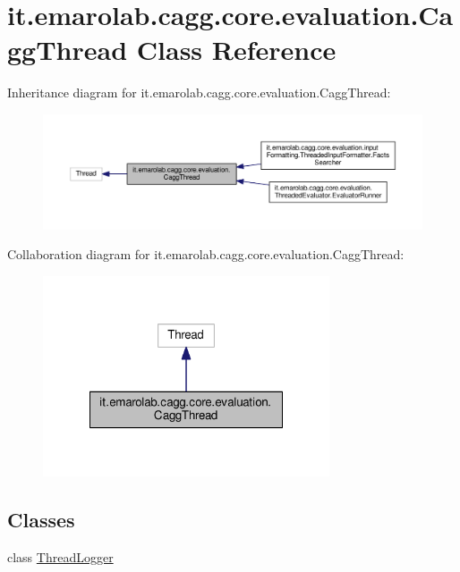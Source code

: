 \hypertarget{classit_1_1emarolab_1_1cagg_1_1core_1_1evaluation_1_1CaggThread}{\section{it.\-emarolab.\-cagg.\-core.\-evaluation.\-Cagg\-Thread Class Reference}
\label{classit_1_1emarolab_1_1cagg_1_1core_1_1evaluation_1_1CaggThread}
}


Inheritance diagram for it.\-emarolab.\-cagg.\-core.\-evaluation.\-Cagg\-Thread\-:\nopagebreak
\begin{figure}[H]
\begin{center}
\leavevmode
\includegraphics[width=350pt]{classit_1_1emarolab_1_1cagg_1_1core_1_1evaluation_1_1CaggThread__inherit__graph}
\end{center}
\end{figure}


Collaboration diagram for it.\-emarolab.\-cagg.\-core.\-evaluation.\-Cagg\-Thread\-:\nopagebreak
\begin{figure}[H]
\begin{center}
\leavevmode
\includegraphics[width=240pt]{classit_1_1emarolab_1_1cagg_1_1core_1_1evaluation_1_1CaggThread__coll__graph}
\end{center}
\end{figure}
\subsection*{Classes}
\begin{DoxyCompactItemize}
\item 
class \hyperlink{classit_1_1emarolab_1_1cagg_1_1core_1_1evaluation_1_1CaggThread_1_1ThreadLogger}{Thread\-Logger}
\end{DoxyCompactItemize}
